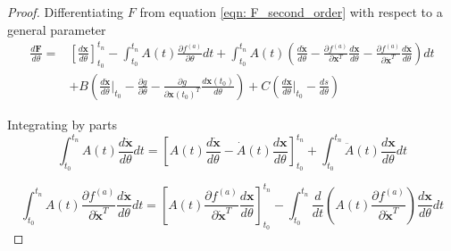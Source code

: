 \documentclass{article}
\theoremstyle{remark}
\theoremstyle{definition}
\begin{document}
\begin{proof}
Differentiating $F$ from equation \ref{eqn: F_second_order} with respect to a general parameter
\begin{equation}
\label{eqn: dFdtheta_second_order_1}
\begin{aligned}
    \frac{d\mathbf{F}}{d\theta} = & \left[ \frac{d\mathbf{x}}{d\theta} \right]_{t_{0}}^{t_{n}}  - \int_{t_{0}}^{t_{n}}A(t)\frac{\partial f^{(a)}}{\partial \theta}dt
    + \int_{t_{0}}^{t_{n}}A(t)\left(
    \frac{d\ddot{\mathbf{x}}}{d\theta}
    - \frac{\partial f^{(a)}}{\partial \mathbf{x}^{T}}\frac{d\mathbf{x}}{d\theta} - 
    \frac{\partial f^{(a)}}{\partial \dot{\mathbf{x}}^{T}}\frac{d\dot{\mathbf{x}}}{d\theta}
    \right)dt \\
    &+B\left(
    \frac{d\dot{\mathbf{x}}}{d\theta}\Biggr\vert_{t_{0}}- \frac{\partial g}{\partial \theta} - \frac{\partial g}{\partial \mathbf{x}(t_{0})^{T}}\frac{d\mathbf{x}(t_{0})}{d\theta}
    \right) 
    + C\left(
    \frac{d\mathbf{x}}{d\theta}\Biggr\vert_{t_{0}} - \frac{ds}{d\theta}
    \right)
\end{aligned}
\end{equation}

Integrating by parts
\begin{equation}
    \int_{t_{0}}^{t_{n}}A(t) \frac{d\ddot{\mathbf{x}}}{d\theta}dt = 
    \left[
    A(t)\frac{d\dot{\mathbf{x}}}{d\theta}-\dot{A}(t)
    \frac{d\mathbf{x}}{d\theta}
    \right]_{t_{0}}^{t_{n}}
    +\int_{t_{0}}^{t_{n}} \ddot{A}(t)
    \frac{d\mathbf{x}}{d\theta}dt    
\end{equation}

\begin{equation}
    \int_{t_{0}}^{t_{n}}A(t)\frac{\partial f^{(a)}}{\partial \dot{\mathbf{x}}^{T}}\frac{d\dot{\mathbf{x}}}{d\theta}dt =
    \left[
    A(t)\frac{\partial f^{(a)}}{\partial \dot{\mathbf{x}}^{T}}
    \frac{d\mathbf{x}}{d\theta}
    \right]_{t_{0}}^{t_{n}}
    - \int_{t_{0}}^{t_{n}}\frac{d}{dt}\left(
    A(t)\frac{\partial f^{(a)}}{\partial \dot{\mathbf{x}}^{T}}
    \right)\frac{d\mathbf{x}}{d\theta}dt
\end{equation}


\end{proof}
\end{document}
